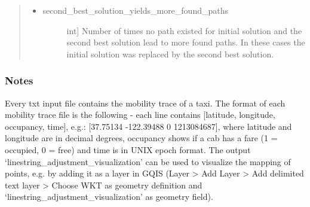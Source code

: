 \documentclass[letterpaper,10pt,english]{sphinxmanual}
\begin{document}
\begin{fulllineitems}
\begin{quote}
\begin{description}
\begin{description}
\begin{itemize}
\begin{description}
\end{description}

\item {} \begin{description}
\item[{second\_best\_solution\_yields\_more\_found\_paths}] \leavevmode{[}int{]}
Number of times no path existed for initial solution and the second best solution lead to more found paths. In these cases the initial solution was replaced by the second best solution.

\end{description}

\end{itemize}

\end{description}

\end{description}\end{quote}
\subsubsection*{Notes}

Every txt input file contains the mobility trace of a taxi. The format of each mobility trace file is the following - each line contains {[}latitude, longitude, occupancy, time{]}, e.g.: {[}37.75134 -122.39488 0 1213084687{]}, where latitude and longitude are in decimal degrees, occupancy shows if a cab has a fare (1 = occupied, 0 = free) and time is in UNIX epoch format.
The output ‘linestring\_adjustment\_visualization’ can be used to visualize the mapping of points, e.g. by adding it as a layer in GQIS (Layer \textgreater{} Add Layer \textgreater{} Add delimited text layer \textendash{}\textgreater{} Choose WKT as geometry definition and ‘linestring\_adjustment\_visualization’ as geometry field).

\end{fulllineitems}

\end{document}
